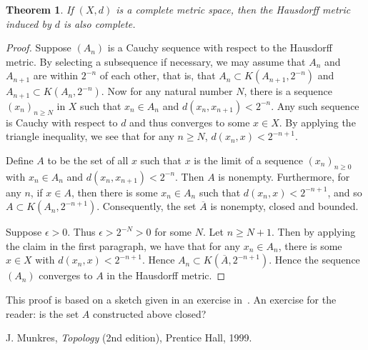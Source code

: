 \documentclass[12pt]{article}
\newtheorem{Theorem}{Theorem}
\begin{document}
\begin{Theorem}
If $(X,d)$ is a complete metric space, then the Hausdorff metric induced by $d$ is also complete.
\end{Theorem}

\begin{proof}
Suppose $(A_n)$ is a Cauchy sequence with respect to the Hausdorff metric.  By selecting a subsequence if necessary, we may assume that $A_n$ and $A_{n+1}$ are within $2^{-n}$ of each other, that is, that $A_n\subset K(A_{n+1},2^{-n})$ and $A_{n+1}\subset K(A_n, 2^{-n})$.
Now for any natural number $N$, there is a sequence $(x_n)_{n\ge N}$ in $X$
such that $x_n\in A_n$ and $d(x_n,x_{n+1})<2^{-n}$.  Any such sequence is Cauchy 
with respect to $d$ and thus converges to some $x\in X$.  By applying the triangle inequality, we see that for any $n\ge N$, $d(x_n,x)<2^{-n+1}$.

Define $A$ to be the set of all $x$ such that $x$ is the limit of a sequence
$(x_n)_{n\ge 0}$ with $x_n\in A_n$ and $d(x_n,x_{n+1})<2^{-n}$.  
Then $A$ is nonempty.  
Furthermore, for any $n$, if $x\in A$,
then there is some $x_n\in A_n$ such that $d(x_n,x)<2^{-n+1}$, and so
$A\subset K(A_n,2^{-n+1})$.  Consequently, the set $\overline{A}$ is
nonempty, closed and bounded.

Suppose $\epsilon>0$.  Thus $\epsilon>2^{-N}>0$ for some $N$.  Let $n\ge N+1$.
Then by applying the claim in the first paragraph, we have that for any
$x_n\in A_n$, there is some $x\in X$ with $d(x_n,x)<2^{-n+1}$.  Hence
$A_n\subset K(\overline{A},2^{-n+1})$.  
Hence the sequence $(A_n)$ converges to $A$ in the Hausdorff metric.
\end{proof}

This proof is based on a sketch given in an exercise in~\cite{Mu}.
An exercise for the reader: is the set $A$ constructed above closed?

\begin{thebibliography}{9}
J. Munkres, \emph{Topology} (2nd edition), Prentice Hall, 1999.
\end{thebibliography}
\end{document}
